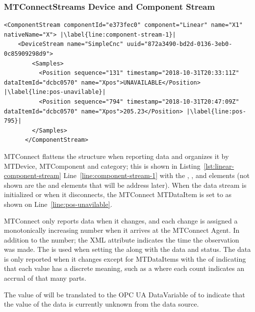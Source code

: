 \subsubsection{MTConnectStreams Device and Component Stream}

\begin{lstlisting}[firstnumber=last,escapechar=|,%
    caption={Component Stream},label={lst:component-stream}]
      <ComponentStream componentId="e373fec0" component="Linear" name="X1" nativeName="X"> |\label{line:component-stream-1}|
    <DeviceStream name="SimpleCnc" uuid="872a3490-bd2d-0136-3eb0-0c85909298d9">    
        <Samples>
          <Position sequence="131" timestamp="2018-10-31T20:33:11Z" dataItemId="dcbc0570" name="Xpos">UNAVAILABLE</Position> |\label{line:pos-unavilable}|
          <Position sequence="794" timestamp="2018-10-31T20:47:09Z" dataItemId="dcbc0570" name="Xpos">205.23</Position> |\label{line:pos-795}|
        </Samples>
      </ComponentStream>
\end{lstlisting}

MTConnect flattens the structure when reporting data and organizes it by \gls{MTDevice}, \gls{MTComponent} and \gls{category}; this is shown in  Listing~\ref{lst:linear-component-stream} Line~\ref{line:component-stream-1} with the , , and  elements (not shown are the  and  elements that will be address later). When the data stream is initialized or when it disconnects, the MTConnect \gls{MTDataItem}  is set to  as shown on Line~\ref{line:pos-unavilable}.

MTConnect only reports data when it changes, and each change is assigned a monotonically increasing  number when it arrives at the MTConnect \gls{Agent}. In addition to the  number; the XML attribute  indicates the time the observation was made. The  is used when setting the   along with the data and status. The data is only reported when it changes except for \glspl{MTDataItem} with the  of  indicating that each value has a discrete meaning, such as a  where each count indicates an accrual of that many parts.

The value of  will be translated to the OPC UA \gls{DataVariable}  of  to indicate that the value of the data is currently unknown from the data source. 

